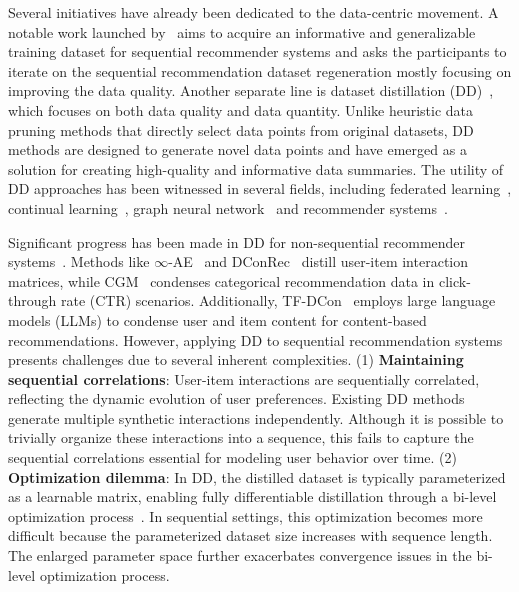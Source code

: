 Several initiatives have already been dedicated to the data-centric movement. A notable work launched by~\cite{yin2024dataset} aims to acquire an informative and generalizable training dataset for sequential recommender systems and asks the participants to iterate on the sequential recommendation dataset regeneration mostly focusing on improving the data quality. Another separate line is dataset distillation (DD)~\cite{wang2018dataset}, which focuses on both data quality and data quantity. Unlike heuristic data pruning methods that directly select data points from original datasets, DD methods are designed to generate novel data points and have emerged as a solution for creating high-quality and informative data summaries. The utility of DD approaches has been witnessed in several fields, including federated learning~\cite{huang2024overcoming, wang2024aggregation, xiong2023feddm, liu2022meta}, continual learning~\cite{masarczyk2020reducing, gu2023summarizing, yang2023efficient, zhang2024learning}, graph neural network~\cite{zhang2024navigating, feng2023fair, gupta2023mirage, yang2024does} and recommender systems~\cite{sachdeva2023farzi, sachdeva2022infinite, wang2023gradient}.


Significant progress has been made in DD for non-sequential recommender systems~\cite{sachdeva2022infinite, wang2023gradient, wu2023leveraging, wu2023dataset}. Methods like $\infty$-AE~\cite{sachdeva2022infinite} and DConRec~\cite{wu2023dataset} distill user-item interaction matrices, while CGM~\cite{wang2023gradient} condenses categorical recommendation data in click-through rate (CTR) scenarios. Additionally, TF-DCon~\cite{wu2023leveraging} employs large language models (LLMs) to condense user and item content for content-based recommendations. However, applying DD to sequential recommendation systems presents challenges due to several inherent complexities.
(1) \textbf{Maintaining sequential correlations}:
User-item interactions are sequentially correlated, reflecting the dynamic evolution of user preferences. Existing DD methods generate multiple synthetic interactions independently. Although it is possible to trivially organize these interactions into a sequence, this fails to capture the sequential correlations essential for modeling user behavior over time.
(2) \textbf{Optimization dilemma}:
In DD, the distilled dataset is typically parameterized as a learnable matrix, enabling fully differentiable distillation through a bi-level optimization process~\cite{dempe2020bilevel}. In sequential settings, this optimization becomes more difficult because the parameterized dataset size increases with sequence length. The enlarged parameter space further exacerbates convergence issues in the bi-level optimization process.


